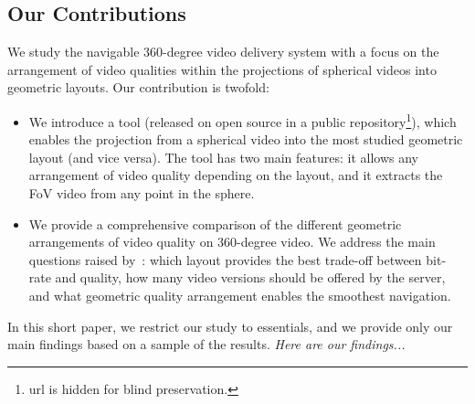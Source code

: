 \subsection{Our Contributions}

%
We study the navigable 360-degree video delivery system with a 
focus on the arrangement of video qualities within the projections of 
spherical videos into geometric layouts. Our contribution is twofold:
\begin{itemize}
\item We introduce a tool (released on open source in a public 
repository\footnote{url is hidden for blind
preservation.}), which enables the projection from a spherical video
into the most studied  geometric layout (and vice versa). The tool has two main 
features: it allows
any arrangement of video quality depending on the layout, and it 
extracts the 
\ac{FoV} video from any point in the sphere. 
\item We provide a comprehensive comparison of the different geometric arrangements of
video quality on 360-degree video. We address the main questions raised 
by~\citet{facebook}: which layout provides the best trade-off 
between bit-rate and
quality, how many video versions should be offered by the server, and what geometric 
quality arrangement 
enables the smoothest navigation.
\end{itemize}

In this short paper, we restrict our study to essentials, and we provide only our main findings based on a 
sample of the results. \textit{Here are our findings...}




